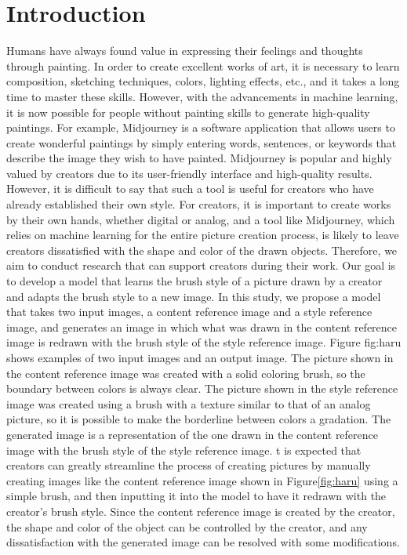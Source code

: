 \documentclass{mva_style}
\begin{document}
\section{Introduction}
Humans have always found value in expressing their feelings and thoughts 
through painting. In order to create excellent works of art, it is necessary 
to learn composition, sketching techniques, colors, lighting effects, etc., 
and it takes a long time to master these skills. However, with the 
advancements in machine learning, it is now possible for people without 
painting skills to generate high-quality paintings. 
For example, Midjourney\cite{Midjourney} is a software application that 
allows users to create wonderful paintings by simply entering words, 
sentences, or keywords that describe the image they wish to have painted. 
Midjourney is popular and highly valued by creators due to its user-friendly 
interface and high-quality results. 
However, it is difficult to say that such a tool is useful for creators who 
have already established their own style. For creators, it is important to 
create works by their own hands, whether digital or analog, and a tool like 
Midjourney, which relies on machine learning for the entire picture creation 
process, is likely to leave creators dissatisfied with the shape and color 
of the drawn objects. Therefore, we aim to conduct research that can support 
creators during their work. Our goal is to develop a model that learns the 
brush style of a picture drawn by a creator and adapts the brush style to a 
new image. In this study, we propose a model that takes two input images, 
a content reference image and a style reference image, and generates an image 
in which what was drawn in the content reference image is redrawn with the 
brush style of the style reference image. 
Figure {fig:haru} shows examples of two input images and an output image.
The picture shown in the content reference image was created with a solid 
coloring brush, so the boundary between colors is always clear. The picture 
shown in the style reference image was created using a brush with a texture 
similar to that of an analog picture, so it is possible to make the 
borderline between colors a gradation. The generated image is a 
representation of the one drawn in the content reference image with the 
brush style of the style reference image.
t is expected that creators can greatly streamline the process of creating 
pictures by manually creating images like the content reference image shown 
in Figure\ref{fig:haru} using a simple brush, and then inputting it into the 
model to have it redrawn with the creator's brush style. Since the content 
reference image is created by the creator, the shape and color of the object 
can be controlled by the creator, and any dissatisfaction with the generated 
image can be resolved with some modifications.
\end{document}
